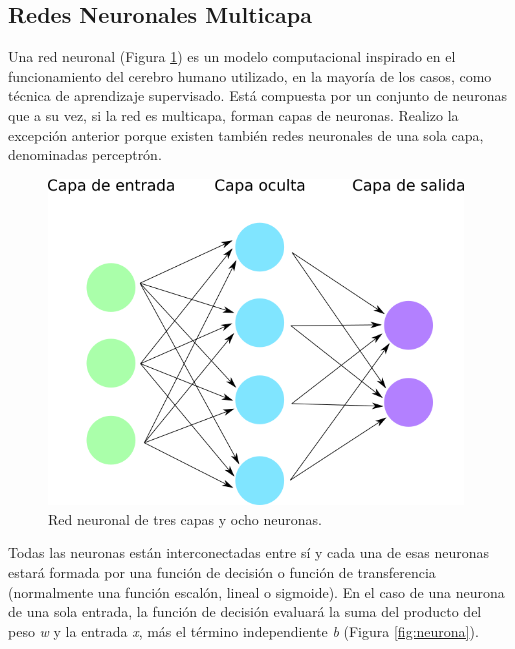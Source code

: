 \subsection{Redes Neuronales Multicapa}

Una red neuronal (Figura \ref{fig:red_neuronal}) es un modelo computacional inspirado en el funcionamiento del cerebro humano utilizado, en la mayoría de los casos, como técnica de aprendizaje supervisado. Está compuesta por un conjunto de neuronas que a su vez, si la red es multicapa, forman capas de neuronas. Realizo la excepción anterior porque existen también redes neuronales de una sola capa, denominadas perceptrón.\\

\begin{figure} [h!]
  \begin{center}
    \includegraphics[width=11cm]{figs/redes_neuronales.png}
  \end{center}
  \caption{Red neuronal de tres capas y ocho neuronas.}
  \label{fig:red_neuronal}
\end{figure}

Todas las neuronas están interconectadas entre sí y cada una de esas neuronas estará formada por una función de decisión o función de transferencia (normalmente una función escalón, lineal o sigmoide). En el caso de una neurona de una sola entrada, la función de decisión evaluará la suma del producto del peso \textit{w} y la entrada \textit{x}, más el término independiente \textit{b} (Figura \ref{fig:neurona}).\\

